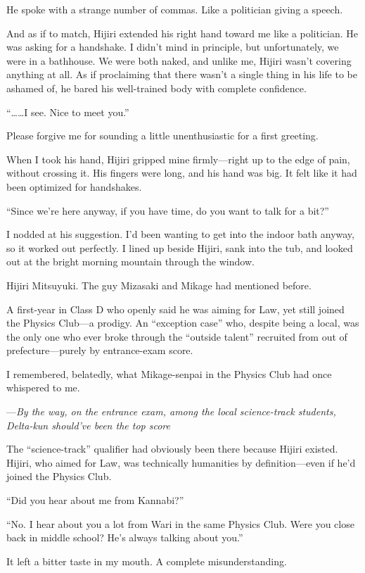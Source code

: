 \documentclass[
    a4paper,
    12pt,
    twoside,
    openany,
    UTF8,
    fontset=windows
]{ctexbook}
\begin{document}
He spoke with a strange number of commas. Like a politician giving a speech.

And as if to match, Hijiri extended his right hand toward me like a politician. He was asking for a handshake. I didn't mind in principle, but unfortunately, we were in a bathhouse. We were both naked, and unlike me, Hijiri wasn't covering anything at all. As if proclaiming that there wasn't a single thing in his life to be ashamed of, he bared his well-trained body with complete confidence.

``\dots\dots I see. Nice to meet you.''

Please forgive me for sounding a little unenthusiastic for a first greeting.

When I took his hand, Hijiri gripped mine firmly---right up to the edge of pain, without crossing it. His fingers were long, and his hand was big. It felt like it had been optimized for handshakes.

``Since we're here anyway, if you have time, do you want to talk for a bit?''

I nodded at his suggestion. I'd been wanting to get into the indoor bath anyway, so it worked out perfectly. I lined up beside Hijiri, sank into the tub, and looked out at the bright morning mountain through the window.

Hijiri Mitsuyuki. The guy Mizasaki and Mikage had mentioned before.

A first-year in Class D who openly said he was aiming for Law, yet still joined the Physics Club---a prodigy. An ``exception case'' who, despite being a local, was the only one who ever broke through the ``outside talent'' recruited from out of prefecture---purely by entrance-exam score.

I remembered, belatedly, what Mikage-senpai in the Physics Club had once whispered to me.

---\textit{By the way, on the entrance exam, among the local science-track students, Delta-kun should've been the top score}

The ``science-track'' qualifier had obviously been there because Hijiri existed. Hijiri, who aimed for Law, was technically humanities by definition---even if he'd joined the Physics Club.

``Did you hear about me from Kannabi?''

``No. I hear about you a lot from Wari in the same Physics Club. Were you close back in middle school? He's always talking about you.''

It left a bitter taste in my mouth. A complete misunderstanding.
\end{document}
